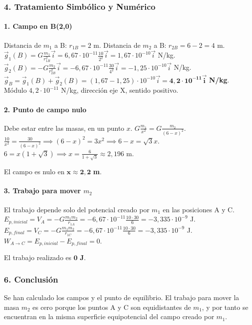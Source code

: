 \subsubsection*{4. Tratamiento Simbólico y Numérico}
\paragraph*{1. Campo en B(2,0)}
Distancia de $m_1$ a B: $r_{1B}=2$ m. Distancia de $m_2$ a B: $r_{2B}=6-2=4$ m.
$\vec{g}_1(B) = G\frac{m_1}{r_{1B}^2}\vec{i} = 6,67\cdot10^{-11}\frac{10}{2^2}\vec{i} = 1,67\cdot10^{-10}\vec{i}$ N/kg.
$\vec{g}_2(B) = -G\frac{m_2}{r_{2B}^2}\vec{i} = -6,67\cdot10^{-11}\frac{30}{4^2}\vec{i} = -1,25\cdot10^{-10}\vec{i}$ N/kg.
$\vec{g}_B = \vec{g}_1(B) + \vec{g}_2(B) = (1,67 - 1,25)\cdot10^{-10}\vec{i} = \boldsymbol{4,2\cdot10^{-11}\vec{i}}$ \textbf{N/kg}.
Módulo $4,2\cdot10^{-11}$ N/kg, dirección eje X, sentido positivo.

\paragraph*{2. Punto de campo nulo}
Debe estar entre las masas, en un punto $x$. $G\frac{m_1}{x^2} = G\frac{m_2}{(6-x)^2}$.
$\frac{10}{x^2} = \frac{30}{(6-x)^2} \implies (6-x)^2 = 3x^2 \implies 6-x = \sqrt{3}x$.
$6 = x(1+\sqrt{3}) \implies x = \frac{6}{1+\sqrt{3}} \approx 2,196$ m.
\begin{cajaresultado}
    El campo es nulo en $\boldsymbol{x \approx 2,2}$ \textbf{m}.
\end{cajaresultado}

\paragraph*{3. Trabajo para mover $m_2$}
El trabajo depende solo del potencial creado por $m_1$ en las posiciones A y C.
$E_{p,inicial} = V_A = -G\frac{m_1 m_2}{r_{1A}} = -6,67\cdot10^{-11}\frac{10 \cdot 30}{6} = -3,335\cdot10^{-9}$ J.
$E_{p,final} = V_C = -G\frac{m_1 m_2}{r_{1C}} = -6,67\cdot10^{-11}\frac{10 \cdot 30}{6} = -3,335\cdot10^{-9}$ J.
$W_{A \to C} = E_{p,inicial} - E_{p,final} = 0$.
\begin{cajaresultado}
    El trabajo realizado es $\boldsymbol{0}$ \textbf{J}.
\end{cajaresultado}

\subsubsection*{6. Conclusión}
\begin{cajaconclusion}
Se han calculado los campos y el punto de equilibrio. El trabajo para mover la masa $m_2$ es cero porque los puntos A y C son equidistantes de $m_1$, y por tanto se encuentran en la misma superficie equipotencial del campo creado por $m_1$.
\end{cajaconclusion}

